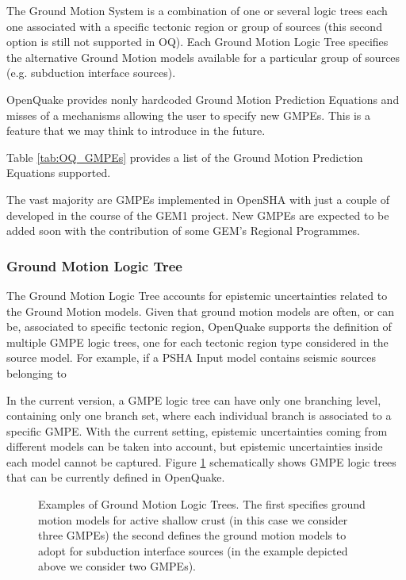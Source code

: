 
%
The Ground Motion System is a combination of one or several logic 
trees each one associated with a specific tectonic region or group 
of sources (this second option is still not supported in OQ).
%
Each Ground Motion Logic Tree specifies the alternative Ground Motion 
models available for a particular group of sources (e.g. subduction 
interface sources).

OpenQuake provides nonly hardcoded Ground Motion Prediction Equations 
and misses of a mechanisms allowing the user to specify new GMPEs. 
This is a feature that we may think to introduce in the future. 

Table \ref{tab:OQ_GMPEs} provides a list of the Ground Motion Prediction 
Equations supported. 

The vast majority are GMPEs implemented in OpenSHA with just a couple 
of developed in the course of the GEM1 project. New GMPEs are expected 
to be added soon with the contribution of some GEM's Regional Programmes.

\subsubsection{Ground Motion Logic Tree}
\label{hazard:gmpe_logic_tree}
The Ground Motion Logic Tree accounts for epistemic uncertainties related 
to the Ground Motion models.  
%
Given that ground motion models are often, or can be, associated to 
specific tectonic region,  OpenQuake supports the definition of multiple 
GMPE logic trees, one for each tectonic region type considered in 
the source model. 
% 
For example, if a PSHA Input model contains seismic sources belonging to 


In the current version, a GMPE logic tree can have only one 
branching level, containing only one branch set, where each individual branch 
is associated to a specific GMPE. With the current setting, epistemic 
uncertainties coming from different models can be taken into account, but 
epistemic uncertainties inside each model cannot be captured.
Figure \ref{fig:GMPELogicTree} schematically shows GMPE logic trees that can 
be currently defined in OpenQuake.
\renewcommand{\psedge}{\ncdiag[armA=0,angleB=180,armB=1cm]}
\begin{figure}[!hb]
\centering

\caption{Examples of Ground Motion Logic Trees. The first specifies ground
motion models for active shallow crust (in this case we consider three GMPEs) 
the second defines the ground motion models to adopt for subduction interface 
sources (in the example depicted above we consider two GMPEs).}
\label{fig:GMPELogicTree}
\end{figure}


%
